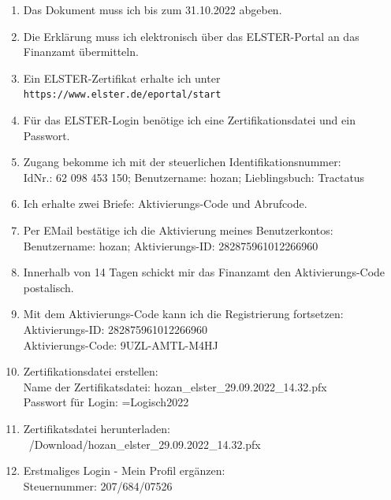 \documentclass[10pt,a4paper]{article}
\begin{document}
\begin{enumerate}[label={\Square}]
    \setlength\itemsep{-3pt}
  
  \item [\XBox] Das Dokument muss ich bis zum 31.10.2022 abgeben.
    
  \item [\XBox] Die Erklärung muss ich elektronisch über das ELSTER-Portal an das
    Finanzamt übermitteln.
    
  \item [\XBox] Ein ELSTER-Zertifikat erhalte ich unter \verb+https://www.elster.de/eportal/start+
    
  \item [\XBox] Für das ELSTER-Login benötige ich eine Zertifikationsdatei und ein Passwort.
    
  \item [\XBox] Zugang bekomme ich mit der steuerlichen Identifikationsnummer: \\
    IdNr.: 62 098 453 150; Benutzername: hozan; Lieblingsbuch: Tractatus
    
  \item [\XBox] Ich erhalte zwei Briefe: Aktivierungs-Code und Abrufcode.
    
  \item [\XBox] Per EMail bestätige ich die Aktivierung meines Benutzerkontos: \\
    Benutzername: hozan; Aktivierungs-ID: 282875961012266960
    
  \item [\XBox] Innerhalb von 14 Tagen schickt mir das Finanzamt den Aktivierungs-Code
    postalisch.
    
  \item [\XBox] Mit dem Aktivierungs-Code kann ich die Registrierung fortsetzen: \\
    Aktivierungs-ID: 282875961012266960 \\
    Aktivierungs-Code: 9UZL-AMTL-M4HJ
    
  \item [\XBox] Zertifikationsdatei erstellen: \\
    Name der Zertifikatsdatei: hozan\_elster\_29.09.2022\_14.32.pfx \\
    Passwort für Login: =Logisch2022

  \item [\XBox] Zertifikatsdatei herunterladen: ~/Download/hozan\_elster\_29.09.2022\_14.32.pfx

  \item [\XBox] Erstmaliges Login - Mein Profil ergänzen: \\
    Steuernummer: 207/684/07526


\end{enumerate}
\end{document}
